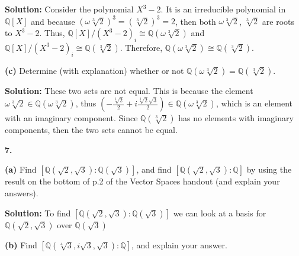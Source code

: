 \documentclass[12pt, a4paper]{article}
\begin{document}
\textbf{Solution:} Consider the polynomial $X^3-2$. It is an irreducible polynomial in $\mathbb{Q}[X]$ and because $(\omega\sqrt[3]{2})^3=(\sqrt[3]{2})^3=2$, then both $\omega\sqrt[3]{2}$, $\sqrt[3]{2}$ are roots to $X^3-2$. Thus, $\mathbb{Q}[X]/(X^3-2)_i\cong\mathbb{Q}(\omega\sqrt[3]{2})$ and $\mathbb{Q}[X]/(X^3-2)_i\cong\mathbb{Q}(\sqrt[3]{2})$. Therefore, $\mathbb{Q}(\omega\sqrt[3]{2})\cong\mathbb{Q}(\sqrt[3]{2})$.

\vspace{4mm}\par

\textbf{(c)} Determine (with explanation) whether or not $\mathbb{Q}(\omega\sqrt[3]{2})=\mathbb{Q}(\sqrt[3]{2})$.

\vspace{4mm}\par

\textbf{Solution:} These two sets are not equal. This is because the element $\omega\sqrt[3]{2}\in\mathbb{Q}(\omega\sqrt[3]{2})$, thus $(-\frac{\sqrt[3]{2}}{2}+i\frac{\sqrt[3]{2}\sqrt{3}}{2})\in\mathbb{Q}(\omega\sqrt[3]{2})$, which is an element with an imaginary component. Since $\mathbb{Q}(\sqrt[3]{2})$ has no elements with imaginary components, then the two sets cannot be equal.

\vspace{6mm}

\noindent\textbf{7.}

\vspace{4mm}\par

\textbf{(a)} Find $[\mathbb{Q}(\sqrt{2},\sqrt{3})\colon\mathbb{Q}(\sqrt{3})]$, and find $[\mathbb{Q}(\sqrt{2},\sqrt{3})\colon\mathbb{Q}]$ by using the result on the bottom of p.2 of the Vector Spaces handout (and explain your answers).

\vspace{4mm}\par

\textbf{Solution:} To find $[\mathbb{Q}(\sqrt{2},\sqrt{3})\colon\mathbb{Q}(\sqrt{3})]$ we can look at a basis for $\mathbb{Q}(\sqrt{2},\sqrt{3})$ over $\mathbb{Q}(\sqrt{3})$

\vspace{4mm}\par

\textbf{(b)} Find $[\mathbb{Q}(\sqrt[4]{3}, i\sqrt{3}, \sqrt{3})\colon\mathbb{Q}]$, and explain your answer.

\vspace{4mm}\par
\end{document}
